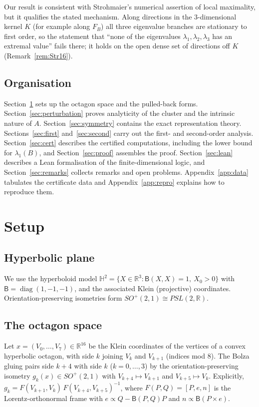 \documentclass[11pt]{amsart}
\theoremstyle{definition}
\theoremstyle{remark}
\newcommand{\R}{\mathbb{R}}
\newcommand{\Hyp}{\mathbb{H}^2}
\newcommand{\FB}{F_B}
\begin{document}
Our result is consistent with Strohmaier's numerical assertion of local maximality, but it
qualifies the stated mechanism. Along directions in the $3$-dimensional kernel $K$ (for
example along $\FB$) all three eigenvalue branches are stationary to first order, so the
statement that ``none of the eigenvalues $\lambda_1,\lambda_2,\lambda_3$ has an extremal
value'' fails there; it holds on the open dense set of directions off $K$
(Remark~\ref{rem:Str16}).

\subsection{Organisation}
Section~\ref{sec:setup} sets up the octagon space and the pulled-back forms.
Section~\ref{sec:perturbation} proves analyticity of the cluster and the intrinsic nature of $A$.
Section~\ref{sec:symmetry} contains the exact representation theory.
Sections~\ref{sec:first} and~\ref{sec:second} carry out the first- and second-order analysis.
Section~\ref{sec:cert} describes the certified computations, including the lower bound for
$\lambda_1(B)$, and Section~\ref{sec:proof}
assembles the proof. Section~\ref{sec:lean} describes a Lean formalisation of the
finite-dimensional logic, and Section~\ref{sec:remarks} collects remarks and open problems.
Appendix~\ref{app:data} tabulates the certificate data and Appendix~\ref{app:repro} explains how
to reproduce them.

\section{Setup}\label{sec:setup}

\subsection{Hyperbolic plane}
We use the hyperboloid model $\Hyp=\{X\in\R^3:\mathsf B(X,X)=1,\ X_0>0\}$ with
$\mathsf B=\operatorname{diag}(1,-1,-1)$, and the associated Klein (projective) coordinates.
Orientation-preserving isometries form $SO^+(2,1)\cong PSL(2,\R)$.

\subsection{The octagon space}\label{subsec:octspace}
Let $x=(V_0,\dots,V_7)\in\R^{16}$ be the Klein coordinates of the vertices of a convex
hyperbolic octagon, with side $k$ joining $V_k$ and $V_{k+1}$ (indices mod $8$). The Bolza
gluing pairs side $k+4$ with side $k$ ($k=0,\dots,3$) by the orientation-preserving isometry
$g_k(x)\in SO^+(2,1)$ with $V_{k+4}\mapsto V_{k+1}$ and $V_{k+5}\mapsto V_k$. Explicitly,
$g_k=F(V_{k+1},V_k)\,F(V_{k+4},V_{k+5})^{-1}$, where $F(P,Q)=[P,e,n]$ is the
Lorentz-orthonormal frame with $e\propto Q-\mathsf B(P,Q)P$ and $n\propto \mathsf B(P\times e)$.
\end{document}
